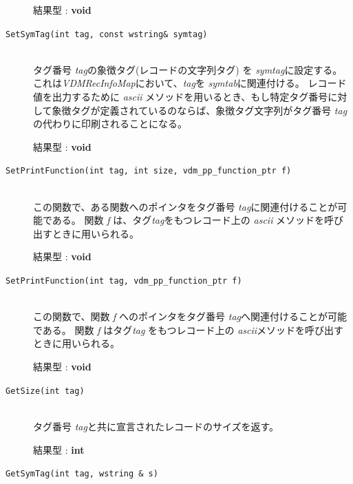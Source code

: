 \documentclass[\pformat,12pt]{jarticle}
\begin{document}
\begin{description}
 結果型 : {\bf void}

\item[{\tt SetSymTag(int tag,  const wstring\& symtag)}]\mbox{}\\

  タグ番号 {\em tag}の象徴タグ(レコードの文字列タグ) を {\em symtag}に設定する。
  これは{\em VDMRecInfoMap}において、{\em tag}を {\em symtab}に関連付ける。
レコード値を出力するために {\em ascii} メソッドを用いるとき、もし特定タグ番号に対して象徴タグが定義されているのならば、象徴タグ文字列がタグ番号 {\em tag}の代わりに印刷されることになる。

  結果型 : {\bf void}

\item[{\tt SetPrintFunction(int tag, int size,
    vdm\_pp\_function\_ptr f)}]  \mbox{}\\
  
 この関数で、ある関数へのポインタをタグ番号 {\em tag}に関連付けることが可能である。 
関数 {\em f} は、タグ{\em tag}をもつレコード上の {\em ascii} メソッドを呼び出すときに用いられる。

  結果型 : {\bf void}

\item[{\tt SetPrintFunction(int tag, vdm\_pp\_function\_ptr f)}]  \mbox{}\\
 
 この関数で、関数 {\em f} へのポインタをタグ番号 {\em tag}へ関連付けることが可能である。
関数 {\em f} はタグ{\em tag} をもつレコード上の {\em ascii}メソッドを呼び出すときに用いられる。

  結果型 : {\bf void}

\item[{\tt GetSize(int tag)}]  \mbox{}\\

  タグ番号 {\em tag}と共に宣言されたレコードのサイズを返す。

  結果型 : {\bf int}

%
%

\item[{\tt GetSymTag(int tag, wstring \& s)}]  \mbox{}\\


\end{description}
\end{document}
